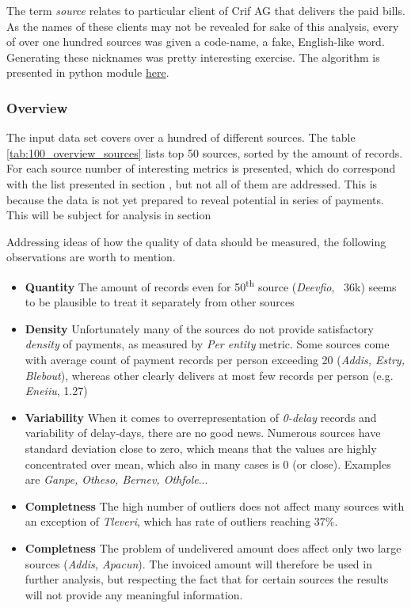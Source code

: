 \documentclass{article}
\begin{document}
The term \textit{source} relates to particular client of Crif AG that delivers the paid bills.
As the names of these clients may not be revealed for sake of this analysis, every of over one hundred sources was given a code-name, a fake, English-like word.
Generating these nicknames was pretty interesting exercise.
The algorithm is presented in python module \href{https://github.com/konradgrodek/ADDS_PayDelay/blob/master/lib/util.py}{here}.

\subsubsection{Overview}

The input data set covers over a hundred of different sources.
The table \ref{tab:100_overview_sources} lists top 50 sources, sorted by the amount of records.
For each source number of interesting metrics is presented, which do correspond with the list presented in section , but not all of them are addressed.
This is because the data is not yet prepared to reveal potential in series of payments.
This will be subject for analysis in section  \par



Addressing ideas of how the quality of data should be measured, the following observations are worth to mention.
\begin{itemize}
    \item \textbf{Quantity} The amount of records even for 50\textsuperscript{th} source (\textit{Deevfio}, ~36k) seems to be plausible to treat it separately from other sources
    \item \textbf{Density} Unfortunately many of the sources do not provide satisfactory \textit{density} of payments, as measured by \textit{Per entity} metric. Some sources come with average count of payment records per person exceeding 20 (\textit{Addis, Estry, Blebout}), whereas other clearly delivers at most few records per person (e.g. \textit{Eneiiu}, 1.27)
    \item \textbf{Variability} When it comes to overrepresentation of \textit{0-delay} records and variability of delay-days, there are no good news. Numerous sources have standard deviation close to zero, which means that the values are highly concentrated over mean, which also in many cases is 0 (or close). Examples are \textit{Ganpe, Otheso, Bernev, Othfole}...
    \item \textbf{Completness} The high number of outliers does not affect many sources with an exception of \textit{Tleveri}, which has rate of outliers reaching 37\%.
    \item \textbf{Completness} The problem of undelivered amount does affect only two large sources (\textit{Addis, Apacun}). The invoiced amount will therefore be used in further analysis, but respecting the fact that for certain sources the results will not provide any meaningful information.
\end{itemize}
\end{document}
